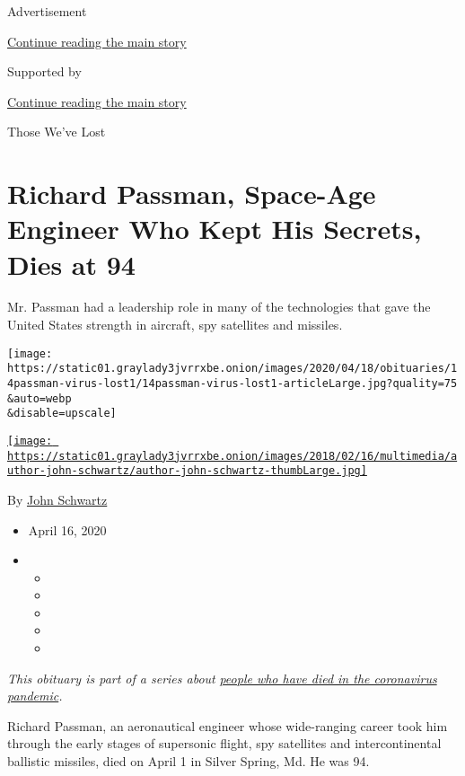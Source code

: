 Advertisement

\protect\hyperlink{after-top}{Continue reading the main story}

Supported by

\protect\hyperlink{after-sponsor}{Continue reading the main story}

Those We've Lost

\hypertarget{richard-passman-space-age-engineer-who-kept-his-secrets-dies-at-94}{%
\section{Richard Passman, Space-Age Engineer Who Kept His Secrets, Dies
at
94}\label{richard-passman-space-age-engineer-who-kept-his-secrets-dies-at-94}}

Mr. Passman had a leadership role in many of the technologies that gave
the United States strength in aircraft, spy satellites and missiles.

\texttt{[image: https://static01.graylady3jvrrxbe.onion/images/2020/04/18/obituaries/14passman-virus-lost1/14passman-virus-lost1-articleLarge.jpg?quality=75\\\&auto=webp\\\&disable=upscale]}

\href{https://www.nytimes3xbfgragh.onion/by/john-schwartz}{\texttt{[image: https://static01.graylady3jvrrxbe.onion/images/2018/02/16/multimedia/author-john-schwartz/author-john-schwartz-thumbLarge.jpg]}}

By \href{https://www.nytimes3xbfgragh.onion/by/john-schwartz}{John
Schwartz}

\begin{itemize}
\item
  April 16, 2020
\item
  \begin{itemize}
  \item
  \item
  \item
  \item
  \item
  \end{itemize}
\end{itemize}

\emph{This obituary is part of a series about}
\href{https://www.nytimes3xbfgragh.onion/series/people-who-have-died-of-the-coronavirus}{\emph{people
who have died in the coronavirus pandemic}}\emph{.}

Richard Passman, an aeronautical engineer whose wide-ranging career took
him through the early stages of supersonic flight, spy satellites and
intercontinental ballistic missiles, died on April 1 in Silver Spring,
Md. He was 94.

